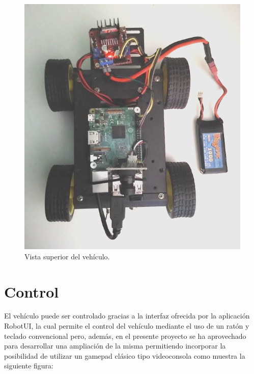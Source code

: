 \begin{figure}[H]
  \begin{center}
    \includegraphics[scale=0.4]{imagenes/robot/robot-bateria-lipo.png}
  \end{center}
  \caption{Vista superior del vehículo.}
  \label{figura:rpi-modulo-bateria}
\end{figure}

\section{Control}

El vehículo puede ser controlado gracias a la interfaz ofrecida por la aplicación RobotUI, la cual permite el control del vehículo mediante el uso de un ratón y teclado convencional pero, además,
en el presente proyecto se ha aprovechado para desarrollar una ampliación de la misma permitiendo incorporar la posibilidad de utilizar un gamepad clásico tipo videoconsola como muestra la siguiente
figura:

